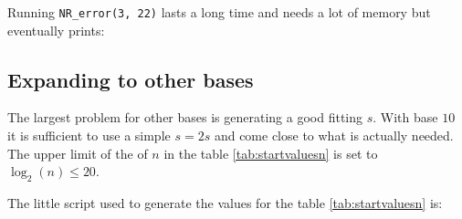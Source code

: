\documentclass[a4paper,10pt]{article}
\theoremstyle{plain} %
\theoremstyle{definition}
\theoremstyle{remark}
\begin{document}
Running \texttt{NR\_error(3, 22)} lasts a long time and needs a lot of memory but eventually prints:

\begin{table}[h]
\begin{center}
\label{tab:nr_error_3_22}
\end{center}
\end{table}

\subsection{Expanding to other bases}

The largest problem for other bases is generating a good fitting $s$. With base $10$ it is sufficient to use a simple $s = 2s$ and come close to what is actually needed. The upper limit of the of $n$ in the table \ref{tab:startvaluesn} is set to $\log_2(n) \le 20$.

The little script used to generate the values for the table \ref{tab:startvaluesn} is:
\end{document}
